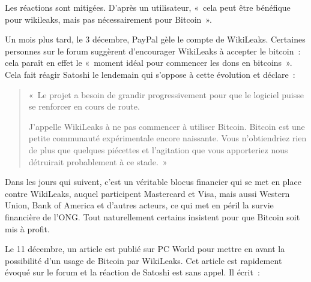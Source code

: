 Les réactions sont mitigées. D'après un utilisateur, «~cela peut être bénéfique pour wikileaks, mais pas nécessairement pour Bitcoin~».

Un mois plus tard, le 3 décembre, PayPal gèle le compte de WikiLeaks. Certaines personnes sur le forum suggèrent d'encourager WikiLeaks à accepter le bitcoin~: cela paraît en effet le «~moment idéal pour commencer les dons en bitcoins~». Cela fait réagir Satoshi le lendemain qui s'oppose à cette évolution et déclare~:

\begin{quote}
«~Le projet a besoin de grandir progressivement pour que le logiciel puisse se renforcer en cours de route.

J'appelle WikiLeaks à ne pas commencer à utiliser Bitcoin. Bitcoin est une petite communauté expérimentale encore naissante. Vous n'obtiendriez rien de plus que quelques piécettes et l'agitation que vous apporteriez nous détruirait probablement à ce stade.~»
\end{quote}

Dans les jours qui suivent, c'est un véritable blocus financier qui se met en place contre WikiLeaks, auquel participent Mastercard et Visa, mais aussi Western Union, Bank of America et d'autres acteurs, ce qui met en péril la survie financière de l'ONG. Tout naturellement certains insistent pour que Bitcoin soit mis à profit.

Le 11 décembre, un article est publié sur PC World pour mettre en avant la possibilité d'un usage de Bitcoin par WikiLeaks. Cet article est rapidement évoqué sur le forum et la réaction de Satoshi est sans appel. Il écrit~:

